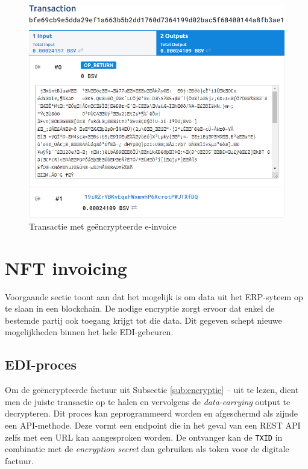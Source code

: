 \begin{figure}[H]
	\centering
	\includegraphics[width=\linewidth]{img/proof-of-concept/transactie-encryptie.png}
	\caption{\label{fig:transactie-encryptie}Transactie met geëncrypteerde e-invoice}
\end{figure}


\section{NFT invoicing}
\label{nft-invoicing}

Voorgaande sectie toont aan dat het mogelijk is om data uit het ERP-syteem op te slaan in een blockchain. De nodige encryptie zorgt ervoor dat enkel de bestemde partij ook toegang krijgt tot die data. Dit gegeven schept nieuwe mogelijkheden binnen het hele EDI-gebeuren.

\subsection{EDI-proces}
\label{sub:edi-proces}

Om de geëncrypteerde factuur uit Subsectie \ref{sub:encryptie} --  uit te lezen, dient men de juiste transactie op te halen en vervolgens de \textit{data-carrying} output te decrypteren. Dit proces kan geprogrammeerd worden en afgeschermd als zijnde een API-methode. Deze vormt een endpoint die in het geval van een REST API zelfs met een URL kan aangesproken worden. De ontvanger kan de \verb|TXID| in combinatie met de \textit{encryption secret} dan gebruiken als token voor de digitale factuur.

